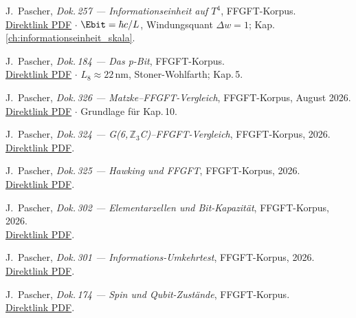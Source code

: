 \begin{description}[leftmargin=3.5em,style=sameline,itemsep=0.4em]
\item[{[P7]}] J.~Pascher, \textit{Dok.\,257 — Informationseinheit auf $T^4$},
  FFGFT-Korpus.\\
  \href{https://github.com/jpascher/T0-Time-Mass-Duality/blob/main/2/pdf/257_Informationseinheit_Skala_De.pdf}{Direktlink PDF}
  $\cdot$ $\Ebit = \hbar c/L$, Windungsquant $\Delta w = 1$; Kap.\,\ref{ch:informationseinheit_skala}.

\item[{[P8]}] J.~Pascher, \textit{Dok.\,184 — Das p-Bit},
  FFGFT-Korpus.\\
  \href{https://github.com/jpascher/T0-Time-Mass-Duality/blob/main/2/pdf/184_p-bit_De.pdf}{Direktlink PDF}
  $\cdot$ $L_8 \approx 22\,\text{nm}$, Stoner-Wohlfarth; Kap.\,5.

\item[{[P9]}] J.~Pascher, \textit{Dok.\,326 — Matzke--FFGFT-Vergleich},
  FFGFT-Korpus, August 2026.\\
  \href{https://github.com/jpascher/T0-Time-Mass-Duality/blob/main/2/pdf/326_Matzke_FFGFT_Vergleich_De.pdf}{Direktlink PDF}
  $\cdot$ Grundlage für Kap.\,10.

\item[{[P10]}] J.~Pascher, \textit{Dok.\,324 — G(6,\,$\mathbb{Z}_3$C)--FFGFT-Vergleich},
  FFGFT-Korpus, 2026.\\
  \href{https://github.com/jpascher/T0-Time-Mass-Duality/blob/main/2/pdf/324_G6_Z3C_FFGFT_Vergleich_De.pdf}{Direktlink PDF}.

\item[{[P11]}] J.~Pascher, \textit{Dok.\,325 — Hawking und FFGFT},
  FFGFT-Korpus, 2026.\\
  \href{https://github.com/jpascher/T0-Time-Mass-Duality/blob/main/2/pdf/325_Hawking_FFGFT_De.pdf}{Direktlink PDF}.

\item[{[P12]}] J.~Pascher, \textit{Dok.\,302 — Elementarzellen und Bit-Kapazität},
  FFGFT-Korpus, 2026.\\
  \href{https://github.com/jpascher/T0-Time-Mass-Duality/blob/main/2/pdf/302_Elementarzellen_Spektrale_Antwort_De.pdf}{Direktlink PDF}.

\item[{[P13]}] J.~Pascher, \textit{Dok.\,301 — Informations-Umkehrtest},
  FFGFT-Korpus, 2026.\\
  \href{https://github.com/jpascher/T0-Time-Mass-Duality/blob/main/2/pdf/301_Information_Umkehrtest_De.pdf}{Direktlink PDF}.

\item[{[P14]}] J.~Pascher, \textit{Dok.\,174 — Spin und Qubit-Zustände},
  FFGFT-Korpus.\\
  \href{https://github.com/jpascher/T0-Time-Mass-Duality/blob/main/2/pdf/174_T0_Spin_Qubit_Zustaende_De.pdf}{Direktlink PDF}.

\end{description}


